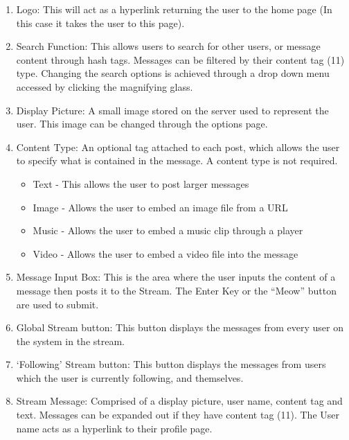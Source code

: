 \documentclass{sig-alt-release2}
\begin{document}
\begin{enumerate}

\item Logo: This will act as a hyperlink returning the user to the home page (In this case it takes the user to this page).

\item Search Function: This allows users to search for other users, or message content through hash tags. Messages can be filtered by their content tag (11) type. Changing the search options is achieved through a drop down menu accessed by clicking the magnifying glass.

\item Display Picture: A small image stored on the server used to represent the user. This image can be changed through the options page.

\item Content Type: An optional tag attached to each post, which allows the user to specify what is contained in the message. A content type is not required.

\begin{itemize}
\item Text - This allows the user to post larger messages
\item Image - Allows the user to embed an image file from a URL
\item Music - Allows the user to embed a music clip through a player
\item Video - Allows the user to embed a video file into the message
\end{itemize}

\item Message Input Box: This is the area where the user inputs the content of a message then posts it to the Stream. The Enter Key or the ``Meow'' button are used to submit.

\item Global Stream button: This button displays the messages from every user on the system in the stream.

\item `Following' Stream button: This button displays the messages from users which the user is currently following, and themselves.

\item Stream Message: Comprised of a display picture, user name, content tag and text. Messages can be expanded out if they have content tag (11). The User name acts as a hyperlink to their profile page.


\end{enumerate}
\end{document}
